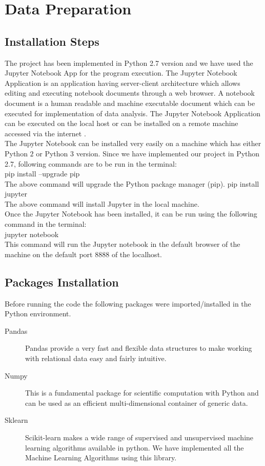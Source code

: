 \section{Data Preparation}

\subsection{Installation Steps}
The project has been implemented in Python 2.7 version and we have used the Jupyter Notebook App for the program execution. The Jupyter Notebook Application is an application having server-client architecture which allows editing and executing notebook documents through a web browser. A notebook document is a human readable and machine executable document which can be executed for implementation of data analysis. The Jupyter Notebook Application can be executed on the local host or can be installed on a remote machine accessed via the internet \cite{link15}. \\
The Jupyter Notebook can be installed very easily on a machine which has either Python $2$ or Python $3$ version. Since we have implemented our project in Python 2.7, following commands are to be run in the terminal:\\
pip install --upgrade pip \\
The above command will upgrade the Python package manager (pip).
pip install jupyter \\
The above command will install Jupyter in the local machine.\\
Once the Jupyter Notebook has been installed, it can be run using the following command in the terminal:\\
jupyter notebook\\
This command will run the Jupyter notebook in the default browser of the machine on the default port $8888$ of the localhost.

\subsection{Packages Installation}
Before running the code the following packages were imported/installed in the Python environment.

\begin{description}
\item[Pandas] Pandas provide a very fast and flexible data structures to make working with relational data easy and fairly intuitive.
\item[Numpy] This is a fundamental package for scientific computation with Python and can be used as an efficient multi-dimensional container of generic data.
\item[Sklearn] Scikit-learn makes a wide range of supervised and unsupervised machine learning algorithms  available in python. We have implemented all the Machine Learning Algorithms using this library.
\end{description}

